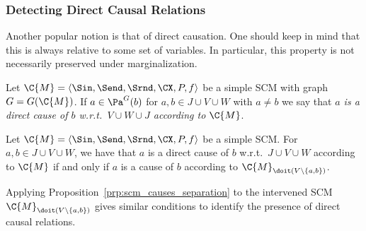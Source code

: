 \subsubsection{Detecting Direct Causal Relations}

Another popular notion is that of direct causation. One should keep in mind that this is always relative to some set of variables.
In particular, this property is not necessarily preserved under marginalization.
\begin{Def}
  Let $\C{M} = \langle \Sin, \Send, \Srnd, \CX, P, f \rangle$ be a simple SCM with graph $G = G(\C{M})$.
  If $a \in \Pa^G(b)$ for $a, b \in J \cup V \cup W$ with $a\ne b$ we say that \emph{$a$ is a direct cause of $b$ w.r.t.\ $V \cup W \cup J$ according to $\C{M}$}.
\end{Def}
\begin{Prp}
  Let $\C{M} = \langle \Sin, \Send, \Srnd, \CX, P, f \rangle$ be a simple SCM.
  For $a,b \in J \cup V \cup W$, we have that $a$ is a direct cause of $b$ w.r.t.\ $J \cup V \cup W$ according to $\C{M}$ if and only if $a$ is a cause of $b$ according to $\C{M}_{\doit(V\setminus\{a,b\})}$.
\end{Prp}
Applying Proposition~\ref{prp:scm_causes_separation} to the intervened SCM $\C{M}_{\doit(V\setminus \{a,b\})}$
gives similar conditions to identify the presence of direct causal relations.
